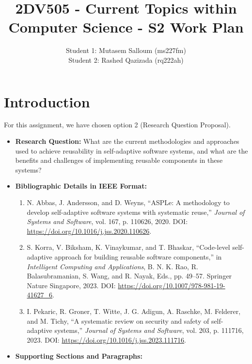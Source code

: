 \documentclass[a4paper, 12pt]{article}
\title{2DV505 - Current Topics within Computer Science - S2 Work Plan}
\author{Student 1: Mutasem Salloum (ms227fm) \\ Student 2: Rashed Qazizada (rq222ah)}
\date{}
\begin{document}
\maketitle

\section{Introduction}
For this assignment, we have chosen option 2 (Research Question Proposal).

\begin{itemize}
    \item \textbf{Research Question:} What are the current methodologies and approaches used to achieve reusability in self-adaptive software systems, and what are the benefits and challenges of implementing reusable components in these systems?
    \item \textbf{Bibliographic Details in IEEE Format:}
    \begin{enumerate}
        \item N. Abbas, J. Andersson, and D. Weyns, ``ASPLe: A methodology to develop self-adaptive software systems with systematic reuse,'' \textit{Journal of Systems and Software}, vol. 167, p. 110626, 2020. DOI: \url{https://doi.org/10.1016/j.jss.2020.110626}.
        \item S. Korra, V. Biksham, K. Vinaykumar, and T. Bhaskar, ``Code-level self-adaptive approach for building reusable software components,'' in \textit{Intelligent Computing and Applications}, B. N. K. Rao, R. Balasubramanian, S. Wang, and R. Nayak, Eds., pp. 49--57. Springer Nature Singapore, 2023. DOI: \url{https://doi.org/10.1007/978-981-19-41627_6}.
        \item I. Pekaric, R. Groner, T. Witte, J. G. Adigun, A. Raschke, M. Felderer, and M. Tichy, ``A systematic review on security and safety of self-adaptive systems,'' \textit{Journal of Systems and Software}, vol. 203, p. 111716, 2023. DOI: \url{https://doi.org/10.1016/j.jss.2023.111716}.
    \end{enumerate}
    \item \textbf{Supporting Sections and Paragraphs:}

\end{itemize}
\end{document}
